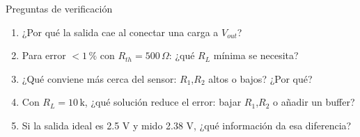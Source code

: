 \documentclass[aspectratio=169]{beamer}
\begin{document}
\begin{frame}{Preguntas de verificación}
  \begin{enumerate}
    \item ¿Por qué la salida cae al conectar una carga a $V_{out}$?
    \item Para error $<1\,\text{\%}$ con $R_{th} = 500\,\Omega$: ¿qué $R_L$ mínima se necesita?
    \item ¿Qué conviene más cerca del sensor: $R_1$,$R_2$ altos o bajos? ¿Por qué?
    \item Con $R_L = 10\,\text{k}$, ¿qué solución reduce el error: bajar $R_1$,$R_2$ o añadir un buffer?
    \item Si la salida ideal es 2.5 V y mido 2.38 V, ¿qué información da esa diferencia?
  \end{enumerate}
\end{frame}
\end{document}
